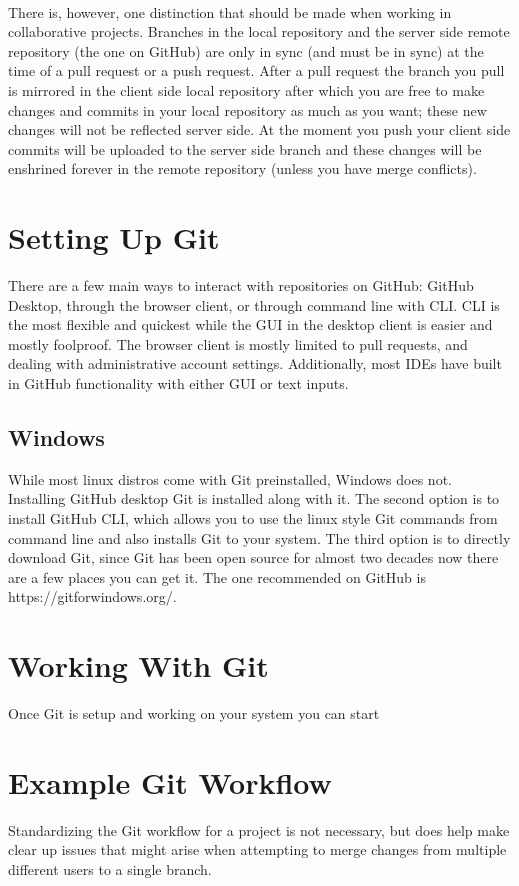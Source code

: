 \documentclass{article}
\begin{document}
\paragraph{}
There is, however, one distinction that should be made when working in collaborative projects. Branches in the local repository and the server side remote repository (the one on GitHub) are only in sync (and must be in sync) at the time of a pull request or a push request. After a pull request the branch you pull is mirrored in the client side local repository after which you are free to make changes and commits in your local repository as much as you want; these new changes will not be reflected server side. At the moment you push your client side commits will be uploaded to the server side branch and these changes will be enshrined forever in the remote repository (unless you have merge conflicts).
\section{Setting Up Git}
There are a few main ways to interact with repositories on GitHub: GitHub Desktop, through the browser client, or through command line with CLI. CLI is the most flexible and quickest while the GUI in the desktop client is easier and mostly foolproof. The browser client is mostly limited to pull requests, and dealing with administrative account settings. Additionally, most IDEs have built in GitHub functionality with either GUI or text inputs. 
\subsection{Windows}
While most linux distros come with Git preinstalled, Windows does not. Installing GitHub desktop Git is installed along with it. The second option is to install GitHub CLI, which allows you to use the linux style Git commands from command line and also installs Git to your system. The third option is to directly download Git, since Git has been open source for almost two decades now there are a few places you can get it. The one recommended on GitHub is https://gitforwindows.org/.
\section{Working With Git}
Once Git is setup and working on your system you can start 

\section{Example Git Workflow}
Standardizing the Git workflow for a project is not necessary, but does help make clear up issues that might arise when attempting to merge changes from multiple different users to a single branch.
\end{document}
